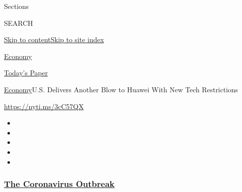 Sections

SEARCH

\protect\hyperlink{site-content}{Skip to
content}\protect\hyperlink{site-index}{Skip to site index}

\href{https://www.nytimes3xbfgragh.onion/section/business/economy}{Economy}

\href{https://myaccount.nytimes3xbfgragh.onion/auth/login?response_type=cookie\&client_id=vi}{}

\href{https://www.nytimes3xbfgragh.onion/section/todayspaper}{Today's
Paper}

\href{/section/business/economy}{Economy}\textbar{}U.S. Delivers Another
Blow to Huawei With New Tech Restrictions

\url{https://nyti.ms/3cC57QX}

\begin{itemize}
\item
\item
\item
\item
\item
\end{itemize}

\hypertarget{the-coronavirus-outbreak}{%
\subsubsection{\texorpdfstring{\href{https://www.nytimes3xbfgragh.onion/news-event/coronavirus?name=styln-coronavirus-markets\&region=TOP_BANNER\&block=storyline_menu_recirc\&action=click\&pgtype=Article\&impression_id=b7c5ae10-f2cb-11ea-b558-854c80501eb6\&variant=undefined}{The
Coronavirus
Outbreak}}{The Coronavirus Outbreak}}\label{the-coronavirus-outbreak}}

